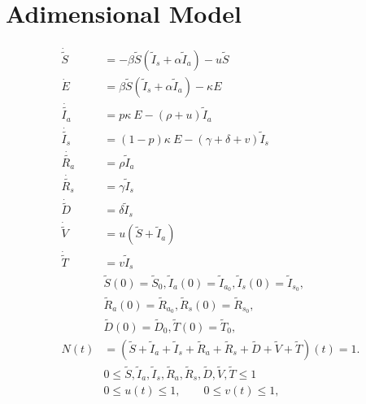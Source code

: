 \documentclass[a4paper,10pt]{amsart}
\begin{document}
    \section{Adimensional Model}
    \begin{equation}
        \begin{aligned}
        	\dot{\tilde{S}}  &= 
            	- \beta \tilde{S}(\tilde{I}_s
            	+\alpha \tilde{I}_a) - u\tilde{S}
        	\\
        	\dot{E} & = \beta \tilde{S} (\tilde{I}_s + \alpha \tilde{I}_a)   
                 - \kappa E 
            	\\
        	\dot{\tilde{I_a}}  &= 
            	p \kappa \ E 
            	- (\rho+u) \tilde{I}_a
        	\\
        	\dot{\tilde{I_s}} &=
            	(1 - p) \kappa \ E 
            	-( \gamma + \delta + v) \tilde{I}_s
        	\\
        	\dot{\tilde{R_a}} &= 
            	\rho \tilde{I}_a
        	\\
        	\dot{\tilde{R_s}} &=
        	\gamma \tilde{I}_s
        	\\
        	\dot{\tilde{D}} &=
        	\delta \tilde{I}_s
        	\\
        	\dot{\tilde{V}} &=
            u(\tilde{S} + \tilde{I}_a)
        	\\
        	\dot{\tilde{T}} &=
            v \tilde{I}_s
        	\\
            	&
            	\tilde{S}(0) = \tilde{S}_0, 
            	\tilde{I}_a(0) =\tilde{I}_{a_0}, 
            	\tilde{I}_s(0) = \tilde{I}_{s_0}, 
        	\\
        &
            	\tilde{R}_a(0)= \tilde{R}_{a_0}, 
            	\tilde{R}_s(0)= \tilde{R}_{s_0},
        	\\
        &
            \tilde{D}(0) = \tilde{D}_0,
            \tilde{T}(0) = \tilde{T}_0,
        \\
        N(t) &=
        (
            \tilde{S} + \tilde{I}_a + \tilde{I}_s + \tilde{R}_a
            + \tilde{R}_s + \tilde{D} + \tilde{V} + \tilde{T} 
        )(t) = 1.
        \\
        & 0\leq
        \tilde{S},
        \tilde{I}_a,
        \tilde{I}_s,
        \tilde{R}_a,
        \tilde{R}_s,
        \tilde{D},
        \tilde{V}, 
        \tilde{T} \leq 1
        \\
        &
        0\leq u(t)\leq 1, \qquad
        0\leq v(t)\leq 1,
        \end{aligned}
    \end{equation}
    
\end{document}
